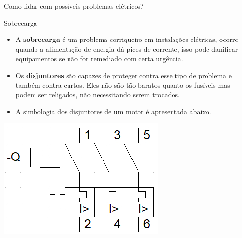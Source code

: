 \begin{frame}{Como lidar com possíveis problemas elétricos?}
\begin{block}{Sobrecarga}
    \begin{itemize}
        \item A \textbf{sobrecarga} é um problema corriqueiro em instalações elétricas, ocorre quando a alimentação de energia dá picos de corrente, isso pode danificar equipamentos se não for remediado com certa urgência.
        \item Os \textbf{disjuntores} são capazes de proteger contra esse tipo de problema e também contra curtos. Eles não são tão baratos quanto os fusíveis mas podem ser religados, não necessitando serem trocados.
        \item A simbologia dos disjuntores de um motor é apresentada abaixo.
    \end{itemize}
\end{block}
\centerline{\includegraphics[height=0.3\textheight]{Figuras/Ch05/fig12.jpg}}
\end{frame}

